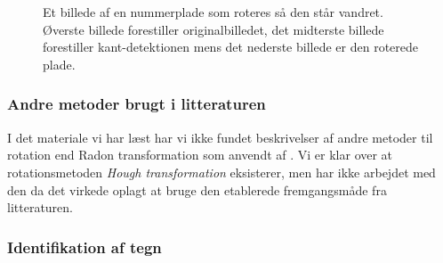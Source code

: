 \begin{figure}[htp]
  \centering
  \begin{minipage}[c]{6 cm}
  \end{minipage}\\
  \begin{minipage}[c]{6 cm}
  \end{minipage}\\
  \begin{minipage}[c]{6 cm}
  \end{minipage}
  \caption{Et billede af en nummerplade som roteres så den står vandret. Øverste billede forestiller originalbilledet, det midterste billede forestiller kant-detektionen mens det nederste billede er den roterede plade.}
  \label{fig:Rotation}
\end{figure}


\subsubsection*{Andre metoder brugt i litteraturen}
I det materiale vi har læst har vi ikke fundet beskrivelser af andre metoder til rotation end Radon transformation som anvendt af \cite{sharpiro}. Vi er klar over at rotationsmetoden \textit{Hough transformation} eksisterer, men har ikke arbejdet med den da det virkede oplagt at bruge den etablerede fremgangsmåde fra litteraturen. 

\subsubsection{Identifikation af tegn}


